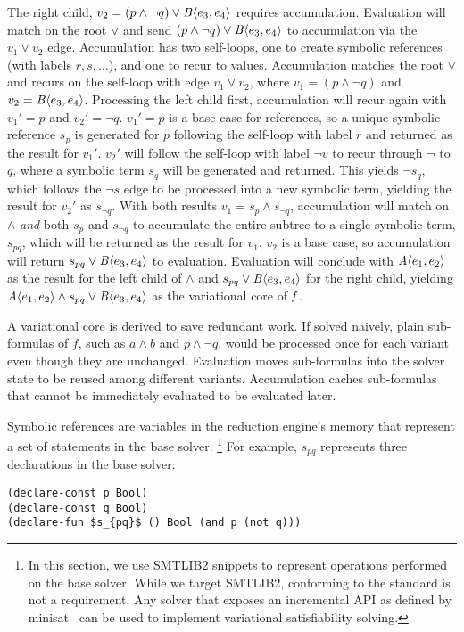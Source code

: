 The right child, $v_2=(p\wedge \neg q) \vee \chc[B]{e_3, e_4}$ requires
accumulation. Evaluation will match on the root $\vee$ and send $(p\wedge \neg
q) \vee \chc[B]{e_3, e_4}$ to accumulation via the $v_{1} \vee v_{2}$ edge.
Accumulation has two self-loops, one to create symbolic references (with labels
$r, s, \hdots$), and one to recur to values. Accumulation matches the root
$\vee$ and recurs on the self-loop with edge $v_{1} \vee v_{2}$, where $v_{1} =
(p\wedge \neg q)$ and $v_{2} = \chc[B]{e_3, e_4}$. Processing the left child
first, accumulation will recur again with $v_{1}' = p$ and $v_{2}' = \neg q$.
$v_{1}' = p$ is a base case for references, so a unique symbolic reference
$s_{p}$ is generated for $p$ following the self-loop with label $r$ and
returned as the result for $v_{1}'$. $v_{2}'$ will follow the self-loop with
label $\neg v$ to recur through $\neg$ to $q$, where a symbolic term $s_{q}$
will be generated and returned. This yields $\neg s_{q}$, which follows the
$\neg s$ edge to be processed into a new symbolic term, yielding the result for
$v_{2}'$ as $s_{\neg q}$. With both results $v_{1} = s_{p}\wedge s_{\neg q}$,
accumulation will match on $\wedge$ \emph{and} both $s_{p}$ and $s_{\neg q}$ to
accumulate the entire subtree to a single symbolic term, $s_{pq}$, which will
be returned as the result for $v_{1}$. $v_{2}$ is a base case, so accumulation
will return $s_{pq} \vee \chc[B]{e_3, e_4}$ to evaluation. Evaluation will
conclude with $\chc[A]{e_1,e_2}$ as the result for the left child of $\wedge$
and $s_{pq} \vee \chc[B]{e_3, e_4}$ for the right child, yielding
$\chc[A]{e_1,e_2} \wedge s_{pq} \vee \chc[B]{e_3, e_4}$ as the variational core
of $\mathit{f}$.

A variational core is derived to save redundant work.
%
If solved naively, plain sub-formulas of $f$, such as $a \wedge b$ and $p
\wedge \neg q$, would be processed once for each variant even though they are
unchanged. Evaluation moves sub-formulas into the solver state to be reused
among different variants. Accumulation caches sub-formulas that cannot be
immediately evaluated to be evaluated later.


Symbolic references are variables in the reduction engine's memory that
represent a set of statements in the base solver.%
%
\footnote{In this section, we use SMTLIB2 snippets to represent operations
performed on the base solver. While we target SMTLIB2, conforming to the
standard is not a requirement. Any solver that exposes an incremental API as
defined by minisat~\cite{10.1007/978-3-319-09284-3_16} can be used to implement
variational satisfiability solving.}
%
For example, $s_{pq}$ represents three declarations in the base solver:
%
\begin{lstlisting}[columns=flexible,keepspaces=true]
(declare-const p Bool)
(declare-const q Bool)
(declare-fun $s_{pq}$ () Bool (and p (not q)))
\end{lstlisting}

